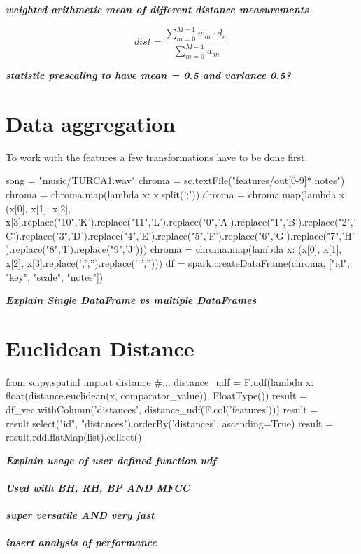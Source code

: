 \noindent\textit{\textbf{weighted arithmetic mean of different distance measurements\\}}

\begin{equation} \label{eq:distance}
dist = \frac{\sum_{m = 0}^{M - 1}{w_m \cdot d_m}}{\sum_{m = 0}^{M - 1}{w_m}}
\end{equation}

\noindent\textit{\textbf{statistic prescaling to have mean = 0.5 and variance 0.5?\\}}


\section{Data aggregation}

To work with the features a few transformations have to be done first. 

\begin{pythonCode}
song = "music/TURCA1.wav"
chroma = sc.textFile("features/out[0-9]*.notes")
chroma = chroma.map(lambda x: x.split(';'))
chroma = chroma.map(lambda x: (x[0], x[1], x[2], x[3].replace("10",'K').replace("11",'L').replace("0",'A').replace("1",'B').replace("2",'C').replace("3",'D').replace("4",'E').replace("5",'F').replace("6",'G').replace("7",'H').replace("8",'I').replace("9",'J')))
chroma = chroma.map(lambda x: (x[0], x[1], x[2], x[3].replace(',','').replace(' ','')))
df = spark.createDataFrame(chroma, ["id", "key", "scale", "notes"])
\end{pythonCode}

\noindent\textbf{\textit{Explain Single DataFrame vs multiple DataFrames}}

\section{Euclidean Distance}

\begin{pythonCode}
from scipy.spatial import distance
#...
distance_udf = F.udf(lambda x: float(distance.euclidean(x, comparator_value)), FloatType())
result = df_vec.withColumn('distances', distance_udf(F.col('features')))
result = result.select("id", "distances").orderBy('distances', ascending=True)
result = result.rdd.flatMap(list).collect()
\end{pythonCode}

\noindent\textit{\textbf{Explain usage of user defined function udf\\}}
\ \\
\noindent\textit{\textbf{Used with BH, RH, BP AND MFCC\\}}
\ \\
\noindent\textit{\textbf{super versatile AND very fast\\}}
\ \\
\noindent\textit{\textbf{insert analysis of performance\\}}

